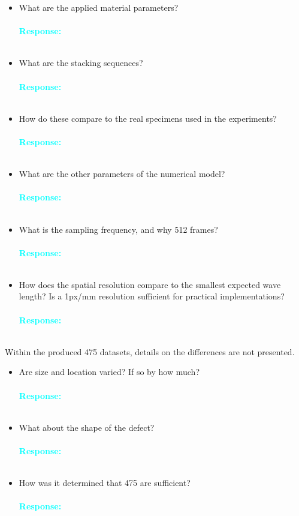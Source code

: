 \documentclass[11pt,a2paper]{report}
\begin{document}
	\begin{itemize}
		\item What are the applied material parameters?
			\\ \\
		\textcolor{Cyan}{
			\textbf{Response:}}
		\\ \\
		\item What are the stacking sequences?
			\\ \\
		\textcolor{Cyan}{
			\textbf{Response:}}
		\\ \\
		\item How do these compare to the real specimens used in the experiments?
			\\ \\
		\textcolor{Cyan}{
			\textbf{Response:}}
		\\ \\
		\item What are the other parameters of the numerical model?
			\\ \\
		\textcolor{Cyan}{
			\textbf{Response:}}
		\\ \\
		\item What is the sampling frequency, and why 512 frames?
			\\ \\
		\textcolor{Cyan}{
			\textbf{Response:}}
		\\ \\
		\item How does the spatial resolution compare to the smallest expected wave length? Is a 1px/mm resolution sufficient for practical implementations?
			\\ \\
		\textcolor{Cyan}{
			\textbf{Response:}}
		\\ \\
	\end{itemize}

	Within the produced 475 datasets, details on the differences are not presented. 
	\begin{itemize}
		\item Are size and location varied? If so by how much?
			\\ \\
		\textcolor{Cyan}{
			\textbf{Response:}}
		\\ \\
		\item What about the shape of the defect?
			\\ \\
		\textcolor{Cyan}{
			\textbf{Response:}}
		\\ \\
		\item How was it determined that 475 are sufficient?
			\\ \\
		\textcolor{Cyan}{
			\textbf{Response:}}
		\\ \\
	\end{itemize}
\end{document}
